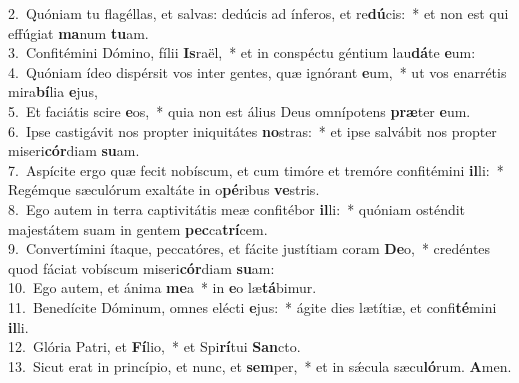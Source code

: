 {2.~}Quóniam tu flagéllas, et salvas: dedúcis ad ínferos, et re\textbf{dú}cis:~* et non est qui effúgiat \textbf{ma}num \textbf{tu}am.\\
{3.~}Confitémini Dómino, fílii \textbf{Is}raël,~* et in conspéctu géntium lau\textbf{dá}te \textbf{e}um:\\
{4.~}Quóniam ídeo dispérsit vos inter gentes, quæ ignórant \textbf{e}um,~* ut vos enarrétis mira\textbf{bí}lia \textbf{e}jus,\\
{5.~}Et faciátis scire \textbf{e}os,~* quia non est álius Deus omnípotens \textbf{præ}ter \textbf{e}um.\\
{6.~}Ipse castigávit nos propter iniquitátes \textbf{no}stras:~* et ipse salvábit nos propter miseri\textbf{cór}diam \textbf{su}am.\\
{7.~}Aspícite ergo quæ fecit nobíscum, et cum timóre et tremóre confitémini \textbf{il}li:~* Regémque sæculórum exaltáte in o\textbf{pé}ribus \textbf{ve}stris.\\
{8.~}Ego autem in terra captivitátis meæ confitébor \textbf{il}li:~* quóniam osténdit majestátem suam in gentem \textbf{pec}ca\textbf{trí}cem.\\
{9.~}Convertímini ítaque, peccatóres, et fácite justítiam coram \textbf{De}o,~* credéntes quod fáciat vobíscum miseri\textbf{cór}diam \textbf{su}am:\\
{10.~}Ego autem, et ánima \textbf{me}a~* in \textbf{e}o læ\textbf{tá}bimur.\\
{11.~}Benedícite Dóminum, omnes elécti \textbf{e}jus:~* ágite dies lætítiæ, et confi\textbf{té}mini \textbf{il}li.\\
{12.~}Glória Patri, et \textbf{Fí}lio,~* et Spi\textbf{rí}tui \textbf{San}cto.\\
{13.~}Sicut erat in princípio, et nunc, et \textbf{sem}per,~* et in sǽcula sæcu\textbf{ló}rum. \textbf{A}men.\\
